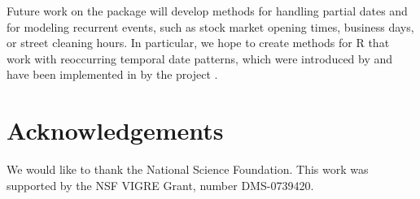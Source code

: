 \documentclass[article]{jss}
\begin{document}
Future work on the  package will develop methods for handling partial dates and for modeling recurrent events, such as stock market opening times, business days, or street cleaning hours. In particular, we hope to create methods for R that work with reoccurring temporal date patterns, which were introduced by \citet{fowler} and have been implemented in  by the  project \citep{runts}.

\section*{Acknowledgements}
We would like to thank the National Science Foundation. This work was supported by the NSF VIGRE Grant, number  DMS-0739420.



\end{document}
